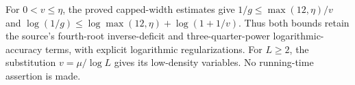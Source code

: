 For $0<v\le\eta$, the proved capped-width estimates give
$1/g\le\max(12,\eta)/v$ and
$\log(1/g)\le\log\max(12,\eta)+\log(1+1/v)$.
Thus both bounds retain the source's fourth-root inverse-deficit and
three-quarter-power logarithmic-accuracy terms, with explicit logarithmic
regularizations. For $L\ge2$, the substitution $v=\mu/\log L$
gives its low-density variables. No running-time assertion is made.
